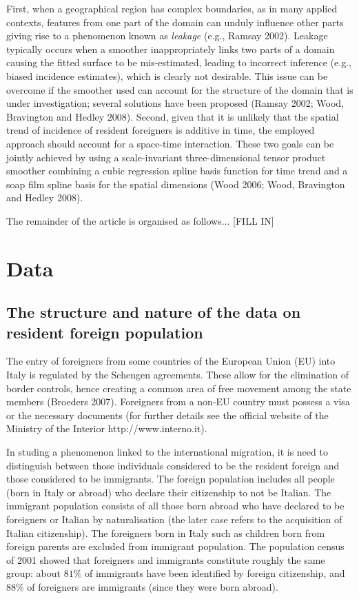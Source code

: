 \documentclass[10pt]{article}
\theoremstyle{definition}
\theoremstyle{plain}
\begin{document}
First, when a geographical region has complex boundaries, as in many applied contexts, features from one part of the domain can unduly influence other parts giving rise to a phenomenon known as \textit{leakage} (e.g., Ramsay 2002). Leakage typically occurs when a smoother inappropriately links two parts of a domain causing the fitted surface to be mis-estimated, leading to incorrect inference (e.g., biased incidence estimates), which is clearly not desirable. This issue can be overcome if the smoother used can account for the structure of the domain that is under investigation; several solutions have been proposed (Ramsay 2002; Wood, Bravington and Hedley 2008). Second, given that it is unlikely that the spatial trend of incidence of resident foreigners is additive in time, the employed approach should account for a space-time interaction. These two goals can be jointly achieved by using a scale-invariant three-dimensional tensor product smoother combining a cubic regression spline basis function for time trend and a soap film spline basis for the spatial dimensions (Wood 2006; Wood, Bravington and Hedley 2008).

The remainder of the article is organised as follows... [FILL IN]


\section{Data \label{DAT}}

\subsection{The structure and nature of the data on resident foreign population \label{SDC}}

The entry of foreigners from some countries of the European Union (EU) into Italy is regulated by the Schengen agreements. These allow for the elimination of border controls, hence creating a common area of free movement among the state members (Broeders 2007). Foreigners from a non-EU country must possess a visa or the necessary documents (for further details see the official website of the Ministry of the Interior http://www.interno.it). 
 
In studing a phenomenon linked to the international migration, it is need to distinguish between those individuals considered to be the resident foreign and those considered to be immigrants. The foreign population includes all people (born in Italy or abroad) who declare their citizenship to not be Italian. The immigrant population consists of all those born abroad who have declared to be foreigners or Italian by naturalisation (the later case refers to the acquisition of Italian citizenship). The foreigners born in Italy such as children born from foreign parents are excluded from immigrant population. The population census of 2001 showed that foreigners and immigrants constitute roughly the same group: about $81\%$ of immigrants have been identified by foreign citizenship, and $88\%$ of foreigners are immigrants (since they were born abroad).
\end{document}
